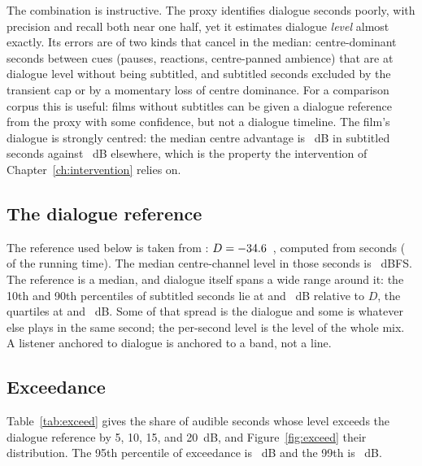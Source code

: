 The combination is instructive. The proxy identifies dialogue seconds poorly, with precision and recall both near one half, yet it estimates dialogue \emph{level} almost exactly. Its errors are of two kinds that cancel in the median: centre-dominant seconds between cues (pauses, reactions, centre-panned ambience) that are at dialogue level without being subtitled, and subtitled seconds excluded by the transient cap or by a momentary loss of centre dominance. For a comparison corpus this is useful: films without subtitles can be given a dialogue reference from the proxy with some confidence, but not a dialogue timeline. The film's dialogue is strongly centred: the median centre advantage is \xCenterAdvDlg~dB in subtitled seconds against \xCenterAdvOther~dB elsewhere, which is the property the intervention of Chapter~\ref{ch:intervention} relies on.

\subsection{The dialogue reference}

The reference used below is taken from \resDialogueSource: $D = -34.6$~\resLevelUnit, computed from \resDialogueSeconds{} seconds (\resDialogueShare{} of the running time). The median centre-channel level in those seconds is \resDialogueCenter~dBFS. The reference is a median, and dialogue itself spans a wide range around it: the 10th and 90th percentiles of subtitled seconds lie at \xDlgPTen{} and \xDlgPNinety~dB relative to $D$, the quartiles at \xDlgPTwentyFive{} and \xDlgPSeventyFive~dB. Some of that spread is the dialogue and some is whatever else plays in the same second; the per-second level is the level of the whole mix. A listener anchored to dialogue is anchored to a band, not a line. 

\subsection{Exceedance}

Table~\ref{tab:exceed} gives the share of audible seconds whose level exceeds the dialogue reference by 5, 10, 15, and 20~dB, and Figure~\ref{fig:exceed} their distribution. The 95th percentile of exceedance is \resPNinetyFive~dB and the 99th is \resPNinetyNine~dB.

